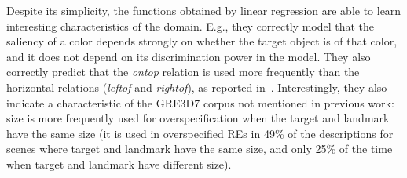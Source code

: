%

Despite its simplicity, the functions obtained by linear regression are able to learn interesting 
characteristics of the domain.  E.g., they correctly model that the saliency of a color depends 
strongly on whether the target object is of that color, and it does not depend on its discrimination power 
in the model.  They also correctly predict that the \emph{ontop} relation is used more frequently than 
the horizontal relations (\emph{leftof} and \emph{rightof}), as reported in~\cite{viet:gene11}. Interestingly, 
they also indicate a characteristic of the GRE3D7 corpus not mentioned in previous work: size is more 
frequently used for overspecification when the target and landmark have the same size (it is used in 
overspecified REs in 49\% of the descriptions for scenes where target and landmark have the same size, and only 25\% of the time when target and landmark have different size). %
